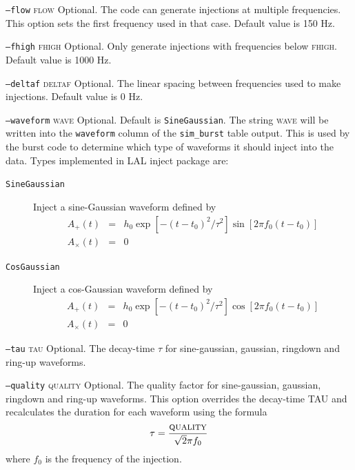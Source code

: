 \begin{entry}
\begin{entry}
\item[\texttt{--flow} \textsc{flow}]
Optional.  The code can generate injections at multiple frequencies.
This option sets the first frequency used in that case.  Default value
is 150 Hz.

\item[\texttt{--fhigh} \textsc{fhigh}]
Optional.  Only generate injections with frequencies below
\textsc{fhigh}.  Default value is 1000 Hz.

\item[\texttt{--deltaf} \textsc{deltaf}]
Optional.  The linear spacing between frequencies used to make
injections.  Default value is 0 Hz.

\item[\texttt{--waveform} \textsc{wave}]
Optional.  Default is \texttt{SineGaussian}.   The string
\textsc{wave} will be written into the \texttt{waveform} column of the
\texttt{sim\_burst} table output. This is used by the burst code to
determine which type of waveforms it should inject into the data.
Types implemented in LAL inject package are:
\begin{description}
\item[\texttt{SineGaussian}]  Inject a sine-Gaussian waveform defined by
\begin{eqnarray}
A_+(t) &=& h_0 \exp[ - (t-t_0)^2/ \tau^2 ] \sin[ 2 \pi f_0 (t-t_0)] \\
A_\times(t) &=& 0
\end{eqnarray}

\item[\texttt{CosGaussian}]  Inject a cos-Gaussian waveform defined by
\begin{eqnarray}
A_+(t) &=& h_0 \exp[ - (t-t_0)^2/ \tau^2 ] \cos[ 2 \pi f_0 (t-t_0)] \\
A_\times(t) &=& 0
\end{eqnarray}
\end{description}

\item[\texttt{--tau} \textsc{tau}]
Optional.  The decay-time $\tau$ for sine-gaussian,  gaussian,  ringdown and
ring-up waveforms.

\item[\texttt{--quality} \textsc{quality}]
Optional.  The quality factor for sine-gaussian,  gaussian,  ringdown and
ring-up waveforms.    This option overrides the decay-time
\textsc{TAU} and recalculates the duration for each waveform using the
formula
$$ 
\tau = \frac{ \textsc{quality} }{ \sqrt{2} \pi f_0 }
$$
where $f_0$ is the frequency of the injection.


\end{entry}
\end{entry}

